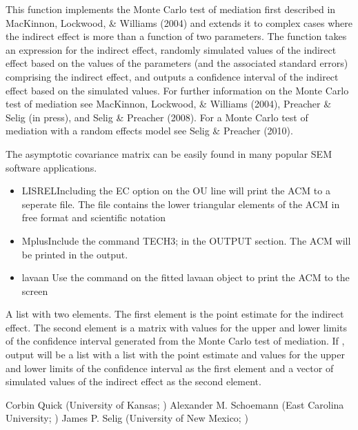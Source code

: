\documentclass[a4paper]{book}
\begin{document}
\begin{Details}\relax
This function implements the Monte Carlo test of mediation first described in MacKinnon, Lockwood, \& Williams (2004) and extends it to complex cases where the indirect effect is more than a function of two parameters. The function takes an expression for the indirect effect, randomly simulated values of the indirect effect based on the values of the parameters (and the associated standard errors) comprising the indirect effect, and outputs a confidence interval of the indirect effect based on the simulated values. For further information on the Monte Carlo test of mediation see MacKinnon, Lockwood, \& Williams (2004), Preacher \& Selig (in press), and Selig \& Preacher (2008). For a Monte Carlo test of mediation with a random effects model see Selig \& Preacher (2010).

The asymptotic covariance matrix can be easily found in many popular SEM software applications.
\begin{itemize}

\item LISRELIncluding the EC option on the OU line will print the ACM to a seperate file. The file contains the lower triangular elements of the ACM in free format and scientific notation
\item MplusInclude the command TECH3; in the OUTPUT section. The ACM will be printed in the output.
\item lavaan Use the command  on the fitted lavaan object to print the ACM to the screen

\end{itemize}

\end{Details}
%
\begin{Value}
A list with two elements. The first element is the point estimate for the indirect effect. The second element is a matrix with values for the upper and lower limits of the confidence interval generated from the Monte Carlo test of mediation. If , output will be a list with a list with  the point estimate and values for the upper and lower limits of the confidence interval as the first element and a vector of simulated values of the indirect effect as the second element.
\end{Value}
%
\begin{Author}\relax
Corbin Quick (University of Kansas; )
Alexander M. Schoemann (East Carolina University; )
James P. Selig (University of New Mexico; )
\end{Author}
\end{document}

